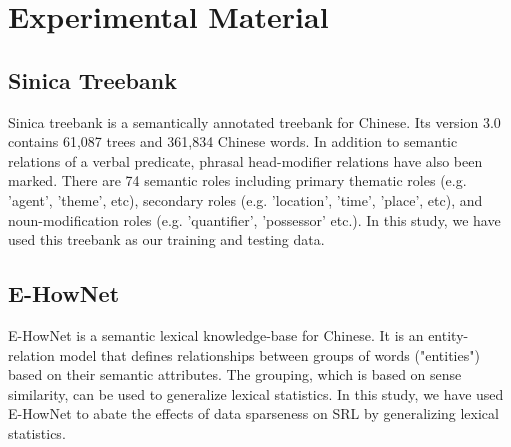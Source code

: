 \documentclass[11pt]{article}
\begin{document}
\section{Experimental Material}
\subsection{Sinica Treebank}
Sinica treebank \cite{sinica-treebank} is a semantically annotated treebank for Chinese. Its version 3.0 contains 61,087 trees and 361,834 Chinese words. In addition to semantic relations of a verbal predicate, phrasal head-modifier relations have also been marked. There are 74 semantic roles including primary thematic roles (e.g. 'agent', 'theme', etc), secondary roles (e.g. 'location', 'time', 'place', etc), and noun-modification roles (e.g. 'quantifier', 'possessor' etc.). In this study, we have used this treebank as our training and testing data.     
\subsection{E-HowNet}
E-HowNet\cite{keylist} is a semantic lexical knowledge-base for Chinese. It is an entity-relation model that defines relationships between groups of words ("entities") based on their semantic attributes. The grouping, which is based on sense similarity, can be used to generalize lexical statistics. In this study, we have used E-HowNet to abate the effects of data sparseness on SRL by generalizing lexical statistics.  
\end{document}
